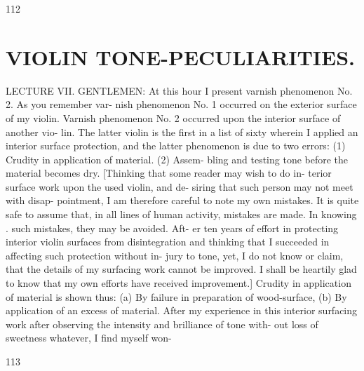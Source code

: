 \documentclass{article}
\begin{document}
112

\section*{VIOLIN TONE-PECULIARITIES.}
LECTURE VII. GENTLEMEN: At this hour I present varnish phenomenon No. 2. As you remember var- nish phenomenon No. 1 occurred on the exterior surface of my violin. Varnish phenomenon No. 2 occurred upon the interior surface of another vio- lin. The latter violin is the first in a list of sixty wherein I applied an interior surface protection, and the latter phenomenon is due to two errors: (1) Crudity in application of material. (2) Assem- bling and testing tone before the material becomes dry. [Thinking that some reader may wish to do in- terior surface work upon the used violin, and de- siring that such person may not meet with disap- pointment, I am therefore careful to note my own mistakes. It is quite safe to assume that, in all lines of human activity, mistakes are made. In knowing . such mistakes, they may be avoided. Aft- er ten years of effort in protecting interior violin surfaces from disintegration and thinking that I succeeded in affecting such protection without in- jury to tone, yet, I do not know or claim, that the details of my surfacing work cannot be improved. I shall be heartily glad to know that my own efforts have received improvement.] Crudity in application of material is shown thus: (a) By failure in preparation of wood-surface, (b) By application of an excess of material. After my experience in this interior surfacing work after observing the intensity and brilliance of tone with- out loss of sweetness whatever, I find myself won-

113
\end{document}
